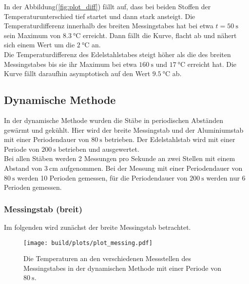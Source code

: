       \noindent In der Abbildung(\ref{fig:plot_diff}) fällt auf, dass bei beiden Stoffen der Temperaturunterschied tief startet und dann stark ansteigt.
      Die Temperaturdifferenz innerhalb des breiten Messingstabes hat bei etwa $ t = \SI{50}{\second}$ sein Maximum von $\SI{8.3}{\celsius}$ erreicht.
      Dann fällt die Kurve, flacht ab und nähert sich einem Wert um die $\SI{2}{\celsius}$ an.\\
      Die Temperaturdifferenz des Edelstahlstabes steigt höher als die des breiten Messingstabes bis sie ihr Maximum 
      bei etwa $\SI{160}{\second} $ und $\SI{17}{\celsius}$ erreicht hat.
      Die Kurve fällt daraufhin asymptotisch auf den Wert $\SI{9.5}{\celsius}$ ab.

    \subsection{Dynamische Methode}

      \noindent In der dynamische Methode wurden die Stäbe in periodischen Abständen gewärmt und gekühlt. 
      Hier wird der breite Messingstab und der Aluminiumstab mit einer Periodendauer von $\SI{80}{\second}$ betrieben. Der Edelstahlstab wird 
      mit einer Periode von $\SI{200}{\second}$ betrieben und ausgewertet.\\ Bei allen Stäben werden 2 Messungen pro Sekunde an zwei Stellen mit einem 
      Abstand von $\SI{3}{\centi\meter}$ aufgenommen. Bei der Messung mit einer Periodendauer von $\SI{80}{\second}$ werden 10 Perioden gemessen, 
      für die Periodendauer von $\SI{200}{\second}$ werden nur 6 Perioden gemessen.
        
      \subsubsection{Messingstab (breit)}

        \noindent Im folgenden wird zunächst der breite Messingstab betrachtet.

        \begin{figure}[ht]
          \centering
          \texttt{[image: build/plots/plot\_messing.pdf]}
          \caption{Die Temperaturen an den verschiedenen Messstellen des Messingstabes in der dynamischen Methode mit einer Periode von $\SI{80}{\second}$.}
          \label{fig:messing_dyn}
        \end{figure}

